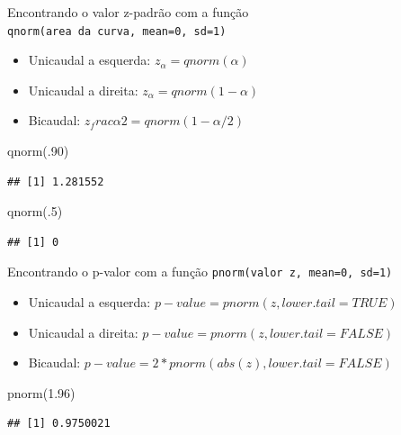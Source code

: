 \documentclass[
]{article}
\newenvironment{Shaded}{\begin{snugshade}}{\end{snugshade}}
\newcommand{\DecValTok}[1]{\textcolor[rgb]{0.00,0.00,0.81}{#1}}
\newcommand{\FloatTok}[1]{\textcolor[rgb]{0.00,0.00,0.81}{#1}}
\newcommand{\FunctionTok}[1]{\textcolor[rgb]{0.00,0.00,0.00}{#1}}
\newcommand{\NormalTok}[1]{#1}
\providecommand{\tightlist}{%
  \setlength{\itemsep}{0pt}\setlength{\parskip}{0pt}}
\begin{document}
Encontrando o valor z-padrão com a função
\texttt{qnorm(area\ da\ curva,\ mean=0,\ sd=1)}

\begin{itemize}
\tightlist
\item
  Unicaudal a esquerda: \(z_\alpha = qnorm(\alpha)\)
\item
  Unicaudal a direita: \(z_\alpha = qnorm(1 - \alpha)\)
\item
  Bicaudal: \(z_frac{\alpha}{2} = qnorm(1 - \alpha/2)\)
\end{itemize}

\begin{Shaded}
\begin{Highlighting}[]
\FunctionTok{qnorm}\NormalTok{(.}\DecValTok{90}\NormalTok{)}
\end{Highlighting}
\end{Shaded}

\begin{verbatim}
## [1] 1.281552
\end{verbatim}

\begin{Shaded}
\begin{Highlighting}[]
\FunctionTok{qnorm}\NormalTok{(.}\DecValTok{5}\NormalTok{)}
\end{Highlighting}
\end{Shaded}

\begin{verbatim}
## [1] 0
\end{verbatim}

Encontrando o p-valor com a função
\texttt{pnorm(valor\ z,\ mean=0,\ sd=1)}

\begin{itemize}
\tightlist
\item
  Unicaudal a esquerda: \(p-value = pnorm(z, lower.tail=TRUE)\)
\item
  Unicaudal a direita: \(p-value = pnorm(z, lower.tail=FALSE)\)
\item
  Bicaudal: \(p-value = 2 * pnorm(abs(z), lower.tail=FALSE)\)
\end{itemize}

\begin{Shaded}
\begin{Highlighting}[]
\FunctionTok{pnorm}\NormalTok{(}\FloatTok{1.96}\NormalTok{)}
\end{Highlighting}
\end{Shaded}

\begin{verbatim}
## [1] 0.9750021
\end{verbatim}
\end{document}
